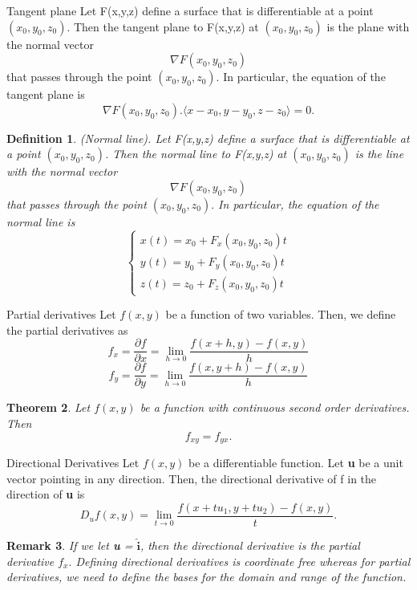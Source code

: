 \documentclass[twoside]{article}
\newcounter{lecnum}
\newtheorem{theorem}{Theorem}[lecnum]
\newtheorem{definition}[theorem]{Definition}
\newtheorem{remark}[theorem]{Remark}
\begin{document}
\begin{definition_exam}{Tangent plane}{} Let F(x,y,z) define a surface that is differentiable at a point $(x_0,y_0,z_0).$ Then the tangent plane to F(x,y,z) at $(x_0,y_0,z_0)$ is the plane with the normal vector 
$$
\nabla F(x_0,y_0,z_0)
$$
that passes through the point $(x_0,y_0,z_0).$ In particular, the equation of the tangent plane is 
$$
\nabla F(x_0,y_0,z_0) . \langle x-x_0,y-y_0,z-z_0 \rangle = 0.
$$
\end{definition_exam}


\begin{definition}(Normal line). Let F(x,y,z) define a surface that is differentiable at a point $(x_0,y_0,z_0)$. Then the normal line to F(x,y,z) at $(x_0,y_0,z_0)$ is the line with the normal vector 
$$
\nabla F(x_0,y_0,z_0)
$$
that passes through the point $(x_0,y_0,z_0).$ In particular, the equation of the normal line is 
$$
\begin{cases}
x(t) = x_0 + F_x(x_0,y_0,z_0)t\\
y(t) = y_0 + F_y(x_0,y_0,z_0)t\\
z(t) = z_0 + F_z(x_0,y_0,z_0)t
\end{cases}
$$
\end{definition}


\begin{definition_exam}{Partial derivatives}{} Let $f(x,y)$ be a function of two variables. Then, we define the partial derivatives as 
$$
f_x = \frac{\partial f}{\partial x} = \lim_{h \rightarrow 0}\frac{f(x+h,y) - f(x,y)}{h}
$$
$$
f_y = \frac{\partial f}{\partial y} = \lim_{h \rightarrow 0}\frac{f(x,y+h) - f(x,y)}{h}
$$
\end{definition_exam}

\begin{theorem}Let $f(x,y)$ be a function with continuous second order derivatives. Then 
$$
f_{xy} = f_{yx}.
$$
\end{theorem}

\begin{definition_exam}{Directional Derivatives}{} Let $f(x,y)$ be a differentiable function. Let \textbf{u} be a unit vector pointing in any direction. Then, the directional derivative of f in the direction of \textbf{u} is 
$$
D_uf(x,y) = \lim_{t \rightarrow 0}\frac{f(x + tu_1, y + tu_2) - f(x,y)}{t}.
$$
\end{definition_exam}

\begin{remark}If we let \textbf{u} = $\hat{\textbf{i}}$, then the directional derivative is the partial derivative $f_x.$ Defining directional derivatives is coordinate free whereas for partial derivatives, we need to define the bases for the domain and range of the function. 
\end{remark}
\end{document}
